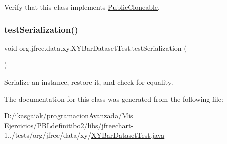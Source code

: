 Verify that this class implements \mbox{\hyperlink{}{Public\+Cloneable}}. \mbox{\label{classorg_1_1jfree_1_1data_1_1xy_1_1_x_y_bar_dataset_test_afff80bfa03a028f090ef008586cec4db}} 
\subsubsection{\texorpdfstring{test\+Serialization()}{testSerialization()}}
{\footnotesize\ttfamily void org.\+jfree.\+data.\+xy.\+X\+Y\+Bar\+Dataset\+Test.\+test\+Serialization (\begin{DoxyParamCaption}{ }\end{DoxyParamCaption})}

Serialize an instance, restore it, and check for equality. 

The documentation for this class was generated from the following file\+:\begin{DoxyCompactItemize}
\item 
D\+:/ikasgaiak/programacion\+Avanzada/\+Mis Ejercicios/\+P\+B\+Ldefinitibo2/libs/jfreechart-\/1../tests/org/jfree/data/xy/\mbox{\hyperlink{_x_y_bar_dataset_test_8java}{X\+Y\+Bar\+Dataset\+Test.\+java}}\end{DoxyCompactItemize}
